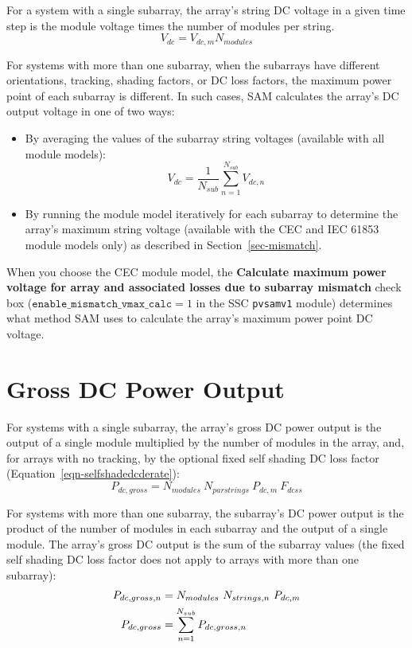 \documentclass[12pt,letterpaper]{article}
\begin{document}
For a system with a single subarray, the array's string DC voltage in a given time step is the module voltage times the number of modules per string.
\begin{equation}
V_{dc} = V_{dc,m} N_{modules}
\end{equation}

For systems with more than one subarray, when the subarrays have different orientations, tracking, shading factors, or DC loss factors, the maximum power point of each subarray is different. In such cases, SAM calculates the array's DC output voltage in one of two ways:
\begin{itemize}
\item By averaging the values of the subarray string voltages (available with all module models): 
\begin{equation}
V_{dc} =  \frac{1}{N_{sub}}\sum_{n=1}^{N_{sub}} V_{dc,n}
\end{equation}
\item By running the module model iteratively for each subarray to determine the array's maximum string voltage (available with the CEC and IEC 61853 module models only) as described in Section~\ref{sec-mismatch}.
\end{itemize}

When you choose the CEC module model, the \textbf{Calculate maximum power voltage for array and associated losses due to subarray mismatch} check box ($\mathtt{enable\_mismatch\_vmax\_calc}=1$ in the SSC \texttt{pvsamv1} module) determines what method SAM uses to calculate the array's maximum power point DC voltage.

\section{Gross DC Power Output}

For systems with a single subarray, the array's gross DC power output is the output of a single module multiplied by the number of modules in the array, and, for arrays with no tracking, by the optional fixed self shading DC loss factor (Equation~\ref{eqn-selfshadedcderate}):
\begin{equation}
P_{dc,gross} = N_{modules}~N_{parstrings}~P_{dc,m}~F_{dcss}
\end{equation}

For systems with more than one subarray, the subarray's DC power output is the product of the number of modules in each subarray and the output of a single module. The array's gross DC output is the sum of the subarray values (the fixed self shading DC loss factor does not apply to arrays with more than one subarray):
\begin{align}
P_{dc,gross,n} &= N_{modules}~N_{strings,n}~P_{dc,m} \notag\\
P_{dc,gross} &= \sum_{n=1}^{N_{sub}} P_{dc,gross,n}
\end{align}
\end{document}
